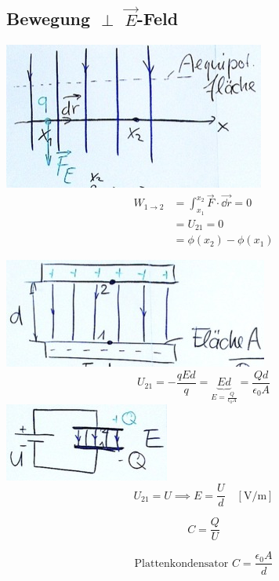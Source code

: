 \subsection{Bewegung \texorpdfstring{$\perp$}{senkrecht zum} \texorpdfstring{$\vec{E}$}{E}-Feld}
\includegraphics{Bild160}
\[ \begin{split}
	W_{1 \rightarrow 2}
		&= \int_{x_1}^{x_2} \vec{F} \cdot \vec{\dd r} = 0 \\
		&= U_{21} = 0 \\
		&= \phi(x_2) - \phi(x_1)
\end{split} \]
\begin{bsp*}[ note = Plattenkondensator ]
	\includegraphics{Bild161}
	\[ U_{21} = - \frac{qEd}{q} = \underbrace{Ed}_{E = \frac{Q}{\epsilon_0 A}} = \frac{Qd}{\epsilon_0 A} \]
	\includegraphics{Bild162}
	\[ U_{21} = U \implies E = \frac{U}{d} \quad \left[ \si{\volt\per\metre} \right] \]
\end{bsp*}
\begin{def*}[ note = Kapazität , index = Kapazität ]
	\[ C = \frac{Q}{U} \]
	
	\[ \text{Plattenkondensator } C = \frac{\epsilon_0 A}{d} \]
\end{def*}

